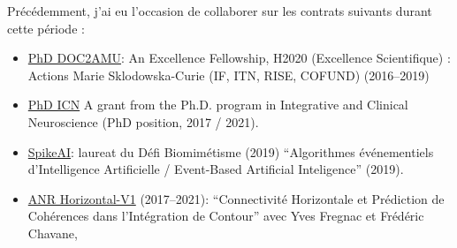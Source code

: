 \documentclass[10pt,french,a4paper,twoside]{article}%
\begin{document}
Précédemment, j'ai eu l'occasion de collaborer sur les contrats suivants durant cette période :
\begin{itemize}
	\item  \href{https://laurentperrinet.github.io/grant/doc-2-amu/}{PhD DOC2AMU}: An Excellence Fellowship, H2020 (Excellence Scientifique) : Actions Marie Sklodowska-Curie (IF, ITN, RISE, COFUND) (2016--2019)
	\item \href{https://laurentperrinet.github.io/grant/phd-icn/}{PhD ICN} A grant from the Ph.D. program in Integrative and Clinical Neuroscience (PhD position, 2017 / 2021).
	\item  \href{https://laurentperrinet.github.io/grant/spikeai/}{SpikeAI}: laureat du Défi Biomimétisme (2019) ``Algorithmes événementiels d’Intelligence Artificielle / Event-Based Artificial Inteligence'' (2019).
	 \item \href{https://laurentperrinet.github.io/grant/anr-horizontal-v1/}{ANR Horizontal-V1} (2017--2021): ``Connectivité Horizontale et Prédiction de Cohérences dans l’Intégration de Contour'' avec Yves Fregnac et Frédéric Chavane,

\end{itemize}
\end{document}
